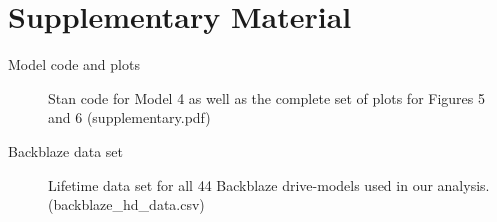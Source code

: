 \documentclass[12pt]{article}
\begin{document}
\section{Supplementary Material}
\label{sec:supple}

\begin{description}

\item[Model code and plots] Stan code for Model 4 as well as the complete set of plots for Figures 5 and 6 (supplementary.pdf)

\item[Backblaze data set] Lifetime data set for all 44 Backblaze drive-models used in our analysis. (backblaze\_hd\_data.csv)

\end{description}

%




\end{document}
